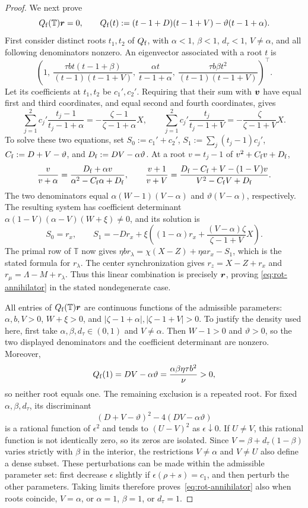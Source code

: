 \begin{proof}
We next prove
\begin{equation}
\label{eq:rot-annihilator}
Q_{\rm f}(\mathbb T)\bm{r}=0,
\qquad Q_{\rm f}(t):=(t-1+D)(t-1+V)-\vartheta(t-1+\alpha).
\end{equation}
First consider distinct roots \(t_1,t_2\) of \(Q_{\rm f}\), with
\(\alpha<1\), \(\beta<1\), \(d_\tau<1\), \(V\ne\alpha\), and all
following denominators nonzero. An eigenvector associated with a root \(t\) is
\[
\left(1,\ \frac{\tau bt(t-1+\beta)}{(t-1)(t-1+V)},\
\frac{\alpha t}{t-1+\alpha},\
\frac{\tau b\beta t^2}{(t-1)(t-1+V)}\right)^\top.
\]
Let its coefficients at \(t_1,t_2\) be \(c_1',c_2'\).
Requiring that their sum with \(\bm{v}\) have equal first and third
coordinates, and equal second and fourth coordinates, gives
\[
\sum_{j=1}^2c_j'\frac{t_j-1}{t_j-1+\alpha}
=-\frac{\zeta-1}{\zeta-1+\alpha}X,
\qquad
\sum_{j=1}^2c_j'\frac{t_j}{t_j-1+V}
=-\frac\zeta{\zeta-1+V}X.
\]
To solve these two equations, set
\(S_0:=c_1'+c_2'\), \(S_1:=\sum_j(t_j-1)c_j'\),
\(C_{\rm f}:=D+V-\vartheta\), and \(D_{\rm f}:=DV-\alpha\vartheta\).
At a root \(v=t_j-1\) of \(v^2+C_{\rm f}v+D_{\rm f}\),
\[
\frac v{v+\alpha}
=\frac{D_{\rm f}+\alpha v}{\alpha^2-C_{\rm f}\alpha+D_{\rm f}},
\qquad
\frac{v+1}{v+V}
=\frac{D_{\rm f}-C_{\rm f}+V-(1-V)v}{V^2-C_{\rm f}V+D_{\rm f}}.
\]
The two denominators equal \(\alpha(W-1)(V-\alpha)\) and
\(\vartheta(V-\alpha)\), respectively. The resulting system has
coefficient determinant \(\alpha(1-V)(\alpha-V)(W+\xi)\ne0\), and its solution is
\[
S_0=r_x,\qquad
S_1=-Dr_x+\xi\left((1-\alpha)r_x+
\frac{(V-\alpha)\zeta}{\zeta-1+V}X\right).
\]
The primal row of \(\mathbb T\) now gives
\(\eta br_\lambda=\chi(X-Z)+\eta ar_x-S_1\), which is the stated
formula for \(r_\lambda\). The center synchronization gives
\(r_z=X-Z+r_x\) and \(r_\mu=\Lambda-M+r_\lambda\).
Thus this linear combination is precisely \(\bm{r}\), proving
\eqref{eq:rot-annihilator} in the stated nondegenerate case.

All entries of \(Q_{\rm f}(\mathbb T)\bm{r}\) are continuous functions
of the admissible parameters: \(\alpha,b,V>0\), \(W+\xi>0\), and
\(|\zeta-1+\alpha|,|\zeta-1+V|>0\).
To justify the density used here, first take
\(\alpha,\beta,d_\tau\in(0,1)\) and \(V\ne\alpha\).
Then \(W-1>0\) and \(\vartheta>0\), so the two displayed denominators
and the coefficient determinant are nonzero. Moreover,
\[
Q_{\rm f}(1)=DV-\alpha\vartheta
=\frac{\alpha\beta\eta\tau b^2}{\nu}>0,
\]
so neither root equals one. The remaining exclusion is a repeated root.
For fixed \(\alpha,\beta,d_\tau\), its discriminant
\[
(D+V-\vartheta)^2-4(DV-\alpha\vartheta)
\]
is a rational function of \(\epsilon^2\) and tends to \((U-V)^2\) as
\(\epsilon\downarrow0\). If \(U\ne V\), this rational function is not
identically zero, so its zeros are isolated. Since
\(V=\beta+d_\tau(1-\beta)\) varies strictly with \(\beta\) in the interior,
the restrictions \(V\ne\alpha\) and \(V\ne U\) also define a dense subset.
These perturbations can be made within the admissible parameter set:
first decrease \(\epsilon\) slightly if
\(\epsilon(\rho+s)=c_1\), and then perturb the other parameters.
Taking limits therefore proves~\eqref{eq:rot-annihilator} also when roots
coincide, \(V=\alpha\), or \(\alpha=1\), \(\beta=1\), or \(d_\tau=1\).


\end{proof}
